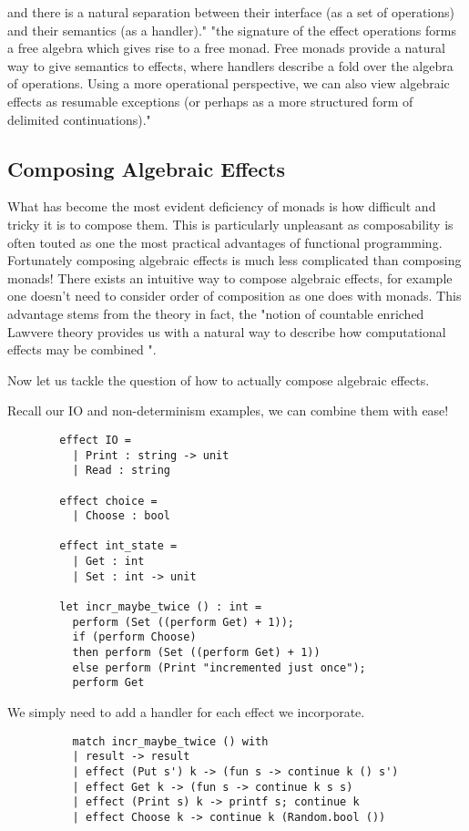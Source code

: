 and there is a natural separation between
their interface (as a set of operations)
and
their semantics (as a handler)."
"the signature of the effect operations forms a free algebra which gives rise to a free monad.
Free monads provide a natural way to give semantics to effects,
where handlers describe a fold over the algebra of operations.
Using a more operational perspective,
we can also view algebraic effects as resumable exceptions
(or perhaps as a more structured form of delimited continuations)."
\cite{leijen2017type}

\subsection{Composing Algebraic Effects}
What has become the most evident deficiency of monads is
how difficult and tricky it is to compose them.
This is particularly unpleasant as
composability is often touted as one the most practical advantages of functional programming.
Fortunately composing algebraic effects is much less complicated than composing monads!
There exists an intuitive way to compose algebraic effects,
for example one doesn't need to consider order of composition as one does with monads.
This advantage stems from the theory in fact,
the "notion of countable enriched Lawvere theory
provides us with a natural way to describe
how computational effects may be combined
"\cite{plotkin2004computational}.

Now let us tackle the question of how to actually compose
algebraic effects.\\

\begin{example}
    Recall our IO and non-determinism examples,
    we can combine them with ease!
    \begin{verbatim}
        effect IO =
          | Print : string -> unit
          | Read : string

        effect choice =
          | Choose : bool

        effect int_state =
          | Get : int
          | Set : int -> unit

        let incr_maybe_twice () : int =
          perform (Set ((perform Get) + 1));
          if (perform Choose)
          then perform (Set ((perform Get) + 1))
          else perform (Print "incremented just once");
          perform Get
    \end{verbatim}
    We simply need to add a handler for each effect we incorporate.
    \begin{verbatim}
          match incr_maybe_twice () with
          | result -> result
          | effect (Put s') k -> (fun s -> continue k () s')
          | effect Get k -> (fun s -> continue k s s)
          | effect (Print s) k -> printf s; continue k
          | effect Choose k -> continue k (Random.bool ())
    \end{verbatim}
\end{example}

